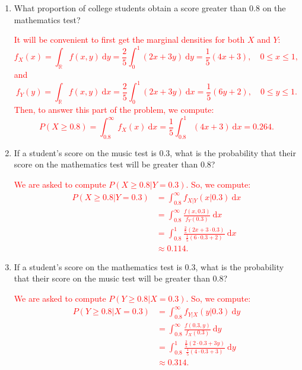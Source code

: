 \documentclass[12pt,reqno]{amsart}
\begin{document}
\medskip
\begin{enumerate}
\item What proportion of college students obtain a score greater than 0.8 on the mathematics test?

\bigskip
\textcolor{red}{It will be convenient to first get the marginal densities for both $X$ and $Y$:
	\[f_X(x) = \int_{\mathbb{R}} f(x,y) \ \text{d} y = \frac{2}{5} \int_0^1 (2x+3y) \ \text{d} y = \frac{1}{5}(4x+3), \quad 0 \leq x \leq 1,
	\]
and
	\[f_Y(y) = \int_{\mathbb{R}} f(x,y) \ \text{d} x = \frac{2}{5} \int_0^1 (2x+3y) \ \text{d} x = \frac{1}{5}(6y+2), \quad 0 \leq y \leq1.
	\]
Then, to answer this part of the problem, we compute:
	\[
	P(X\geq 0.8) = \int_{0.8}^\infty f_X(x) \ \text{d} x = \frac{1}{5} \int_{0.8}^1 (4x+3) \ \text{d} x = 0.264.
	\]}
\bigskip

\item If a student’s score on the music test is 0.3, what is the probability that their score on the mathematics test will be greater than 0.8?

\bigskip
\textcolor{red}{We are asked to compute $P(X\geq 0.8 | Y=0.3)$. So, we compute:
	\begin{align*}
	P(X\geq 0.8 | Y=0.3) &= \int_{0.8}^\infty f_{X|Y}(x|0.3) \ \text{d} x \\
	&= \int_{0.8}^\infty \frac{f(x,0.3)}{f_Y(0.3)} \ \text{d} x \\
	&= \int_{0.8}^1 \frac{ \frac{2}{5}(2x+3\cdot 0.3)}{\frac{1}{5}(6\cdot 0.3 + 2)} \ \text{d} x \\
	&\approx 0.114. 
	\end{align*}}
\bigskip

\item If a student’s score on the mathematics test is 0.3, what is the probability that their score on the music test will be greater than 0.8?

\bigskip
\textcolor{red}{We are asked to compute $P(Y\geq 0.8 | X=0.3)$. So, we compute:
	\begin{align*}
	P(Y\geq 0.8 | X=0.3) &= \int_{0.8}^\infty f_{Y|X}(y|0.3) \ \text{d} y \\
	&= \int_{0.8}^\infty \frac{f(0.3,y)}{f_X(0.3)} \ \text{d} y \\
	&= \int_{0.8}^1 \frac{ \frac{2}{5}(2\cdot 0.3+3y)}{\frac{1}{5}(4\cdot 0.3 + 3)} \ \text{d} y \\
	&\approx 0.314. 
	\end{align*}}
\bigskip


\end{enumerate}
\end{document}
